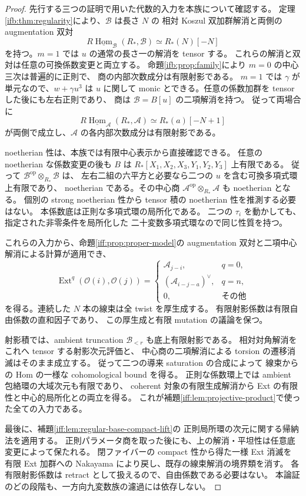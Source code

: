 \begin{proof}
先行する三つの証明で用いた代数的入力を本族について確認する。
定理\ref{ifb:thm:regularity}により、$\mathcal B$ は長さ $N$ の
相対 Koszul 双加群解消と両側の augmentation 双対
\[
 R\underline{\operatorname{Hom}}_{\mathcal B}(R_*,\mathcal B)
       \simeq R_*(N)[-N]
\]
を持つ。$m=1$ では $u$ の通常の長さ一の解消を tensor する。
これらの解消と双対は任意の可換係数変更と両立する。
命題\ref{ifb:prop:family}により $m=0$ の中心三次は普遍的に正則で、
商の内部次数成分は有限射影である。
$m=1$ では $\gamma$ が単元なので、$w+\gamma u^3$ は $u$ に関して
monic とできる。任意の係数加群を tensor した後にも左右正則であり、
商は $\mathcal B=B[u]$ の二項解消を持つ。
従って両場合に
\[
 R\underline{\operatorname{Hom}}_{\mathcal A}(R_*,\mathcal A)
       \simeq R_*(a)[-N+1]
\]
が両側で成立し、$\mathcal A$ の各内部次数成分は有限射影である。

noetherian 性は、本族では有限中心表示から直接確認できる。
任意の noetherian な係数変更の後も $B$ は
$R_*[X_1,X_2,X_3,Y_1,Y_2,Y_3]$ 上有限である。
従って $\mathcal B^{\mathrm{op}}\otimes_{R_*}\mathcal B$ は、
左右二組の六平方と必要なら二つの $u$ を含む可換多項式環上有限であり、
noetherian である。その中心商
$\mathcal A^{\mathrm{op}}\otimes_{R_*}\mathcal A$ も noetherian となる。
個別の strong noetherian 性から tensor 積の noetherian 性を推測する必要はない。
本係数底は正則な多項式環の局所化である。
二つの $\tau_i$ を動かしても、指定された非零条件を局所化した
二十変数多項式環なので同じ性質を持つ。

これらの入力から、命題\ref{iff:prop:proper-model}の
augmentation 双対と二項中心解消による計算が適用でき、
\begin{equation}\label{ifg:eq:line-hom}
 \operatorname{Ext}^q(\mathcal O(i),\mathcal O(j))=
 \begin{cases}
   \mathcal A_{j-i},&q=0,\\
   (\mathcal A_{i-j-a})^\vee,&q=n,\\
   0,&\text{その他}
 \end{cases}
\end{equation}
を得る。連続した $N$ 本の線束は全 twist を厚生成する。
有限射影係数は有限自由係数の直和因子であり、
この厚生成と有限 mutation の議論を保つ。

射影積では、ambient truncation $\mathcal B_{<r}$ も底上有限射影である。
相対対角解消をこれへ tensor する射影次元評価と、
中心商の二項解消による torsion の遷移消滅はそのまま成立する。
従って二つの導来 saturation の合成によって
線束からの Hom の一様な cohomological bound を得る。
正則な係数環上では ambient 包絡環の大域次元も有限であり、
coherent 対象の有限生成解消から Ext の有限性と中心的局所化との両立を得る。
これが補題\ref{iff:lem:projective-product}で使った全ての入力である。

最後に、補題\ref{iff:lem:regular-base-compact-lift}の
正則局所環の次元に関する帰納法を適用する。
正則パラメータ商を取った後にも、上の解消・平坦性は任意底変更によって保たれる。
閉ファイバーの compact 性から得た一様 Ext 消滅を
有限 Ext 加群への Nakayama により戻し、既存の線束解消の境界類を消す。
各有限射影係数は retract として扱えるので、自由係数である必要はない。
本論証のどの段階も、一方向九変数族の濾過には依存しない。
\end{proof}

